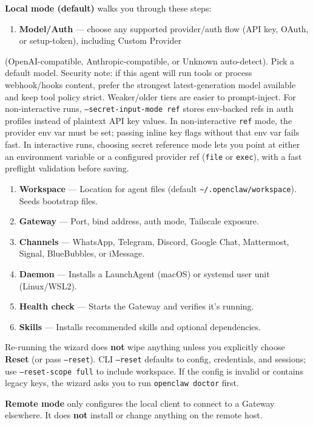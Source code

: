 \textbf{Local mode (default)} walks you through these steps:

\begin{enumerate}
  \item \textbf{Model/Auth} — choose any supported provider/auth flow (API key, OAuth, or setup-token), including Custom Provider
\end{enumerate}

(OpenAI-compatible, Anthropic-compatible, or Unknown auto-detect). Pick a default model.
Security note: if this agent will run tools or process webhook/hooks content, prefer the strongest latest-generation model available and keep tool policy strict. Weaker/older tiers are easier to prompt-inject.
For non-interactive runs, \texttt{--secret-input-mode ref} stores env-backed refs in auth profiles instead of plaintext API key values.
In non-interactive \texttt{ref} mode, the provider env var must be set; passing inline key flags without that env var fails fast.
In interactive runs, choosing secret reference mode lets you point at either an environment variable or a configured provider ref (\texttt{file} or \texttt{exec}), with a fast preflight validation before saving.
\begin{enumerate}
  \item \textbf{Workspace} — Location for agent files (default \texttt{\textasciitilde{}/.openclaw/workspace}). Seeds bootstrap files.
  \item \textbf{Gateway} — Port, bind address, auth mode, Tailscale exposure.
  \item \textbf{Channels} — WhatsApp, Telegram, Discord, Google Chat, Mattermost, Signal, BlueBubbles, or iMessage.
  \item \textbf{Daemon} — Installs a LaunchAgent (macOS) or systemd user unit (Linux/WSL2).
  \item \textbf{Health check} — Starts the Gateway and verifies it's running.
  \item \textbf{Skills} — Installs recommended skills and optional dependencies.
\end{enumerate}


Re-running the wizard does \textbf{not} wipe anything unless you explicitly choose \textbf{Reset} (or pass \texttt{--reset}).
CLI \texttt{--reset} defaults to config, credentials, and sessions; use \texttt{--reset-scope full} to include workspace.
If the config is invalid or contains legacy keys, the wizard asks you to run \texttt{openclaw doctor} first.

\textbf{Remote mode} only configures the local client to connect to a Gateway elsewhere.
It does \textbf{not} install or change anything on the remote host.

